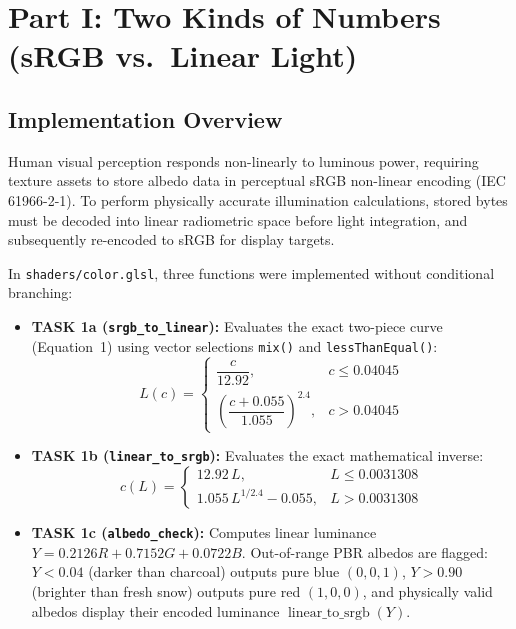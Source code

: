 \documentclass[10pt,a4paper]{article}
\begin{document}
\section{Part I: Two Kinds of Numbers (sRGB vs.\ Linear Light)}

\subsection{Implementation Overview}
Human visual perception responds non-linearly to luminous power, requiring texture assets to store albedo data in perceptual sRGB non-linear encoding (IEC 61966-2-1). To perform physically accurate illumination calculations, stored bytes must be decoded into linear radiometric space before light integration, and subsequently re-encoded to sRGB for display targets.

In \texttt{shaders/color.glsl}, three functions were implemented without conditional branching:
\begin{itemize}
    \item \textbf{TASK 1a (\texttt{srgb\_to\_linear}):} Evaluates the exact two-piece curve (Equation~1) using vector selections \texttt{mix()} and \texttt{lessThanEqual()}:
    \[
    L(c) = \begin{cases} \dfrac{c}{12.92}, & c \le 0.04045 \\[1em] \left(\dfrac{c + 0.055}{1.055}\right)^{2.4}, & c > 0.04045 \end{cases}
    \]
    \item \textbf{TASK 1b (\texttt{linear\_to\_srgb}):} Evaluates the exact mathematical inverse:
    \[
    c(L) = \begin{cases} 12.92\,L, & L \le 0.0031308 \\[0.8em] 1.055\,L^{1/2.4} - 0.055, & L > 0.0031308 \end{cases}
    \]
    \item \textbf{TASK 1c (\texttt{albedo\_check}):} Computes linear luminance $Y = 0.2126R + 0.7152G + 0.0722B$. Out-of-range PBR albedos are flagged: $Y < 0.04$ (darker than charcoal) outputs pure blue $(0, 0, 1)$, $Y > 0.90$ (brighter than fresh snow) outputs pure red $(1, 0, 0)$, and physically valid albedos display their encoded luminance $\operatorname{linear\_to\_srgb}(Y)$.
\end{itemize}
\end{document}
